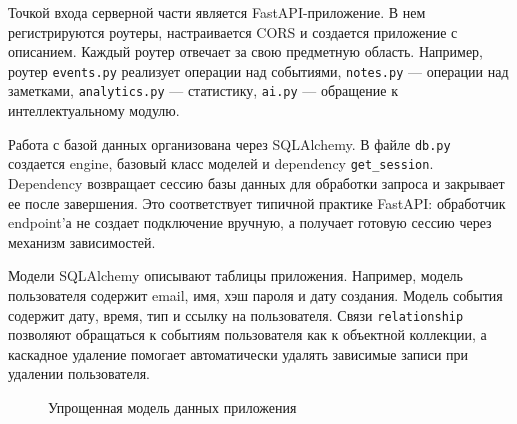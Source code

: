 \documentclass[14pt,a4paper]{extreport}
\begin{document}
Точкой входа серверной части является FastAPI-приложение. В нем регистрируются роутеры, настраивается CORS и создается приложение с описанием. Каждый роутер отвечает за свою предметную область. Например, роутер \texttt{events.py} реализует операции над событиями, \texttt{notes.py} --- операции над заметками, \texttt{analytics.py} --- статистику, \texttt{ai.py} --- обращение к интеллектуальному модулю.

Работа с базой данных организована через SQLAlchemy. В файле \texttt{db.py} создается engine, базовый класс моделей и dependency \texttt{get\_session}. Dependency возвращает сессию базы данных для обработки запроса и закрывает ее после завершения. Это соответствует типичной практике FastAPI: обработчик endpoint'а не создает подключение вручную, а получает готовую сессию через механизм зависимостей.

Модели SQLAlchemy описывают таблицы приложения. Например, модель пользователя содержит email, имя, хэш пароля и дату создания. Модель события содержит дату, время, тип и ссылку на пользователя. Связи \texttt{relationship} позволяют обращаться к событиям пользователя как к объектной коллекции, а каскадное удаление помогает автоматически удалять зависимые записи при удалении пользователя.

\begin{figure}[H]
\centering
{}
\caption{Упрощенная модель данных приложения}
\end{figure}
\end{document}

